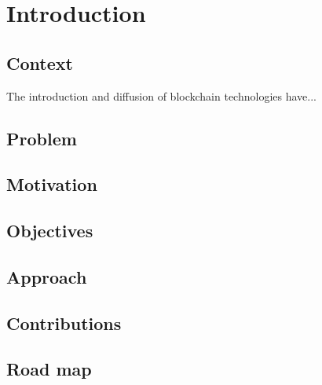 \chapter{Introduction}

\section{Context}
The introduction and diffusion of blockchain technologies have...

\section{Problem}

\section{Motivation}

\section{Objectives}

\section{Approach}

\section{Contributions}

\section{Road map}


